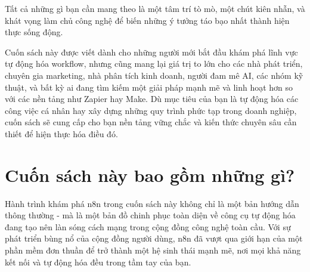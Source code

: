 \documentclass[a4paper,12pt,oneside]{book}
\begin{document}
Tất cả những gì bạn cần mang theo là một tâm trí tò mò, một chút kiên nhẫn, và khát vọng làm chủ công nghệ để biến những ý tưởng táo bạo nhất thành hiện thực sống động.

Cuốn sách này được viết dành cho những người mới bắt đầu khám phá lĩnh vực tự động hóa workflow, nhưng cũng mang lại giá trị to lớn cho các nhà phát triển, chuyên gia marketing, nhà phân tích kinh doanh, người đam mê AI, các nhóm kỹ thuật, và bất kỳ ai đang tìm kiếm một giải pháp mạnh mẽ và linh hoạt hơn so với các nền tảng như Zapier hay Make. Dù mục tiêu của bạn là tự động hóa các công việc cá nhân hay xây dựng những quy trình phức tạp trong doanh nghiệp, cuốn sách sẽ cung cấp cho bạn nền tảng vững chắc và kiến thức chuyên sâu cần thiết để hiện thực hóa điều đó.

\newpage
\section*{Cuốn sách này bao gồm những gì?}
\begin{center}
    
\end{center}

Hành trình khám phá n8n trong cuốn sách này không chỉ là một bản hướng dẫn thông thường - mà là một bản đồ chinh phục toàn diện về công cụ tự động hóa đang tạo nên làn sóng cách mạng trong cộng đồng công nghệ toàn cầu. Với sự phát triển bùng nổ của cộng đồng người dùng, n8n đã vượt qua giới hạn của một phần mềm đơn thuần để trở thành một hệ sinh thái mạnh mẽ, nơi mọi khả năng kết nối và tự động hóa đều trong tầm tay của bạn.
\end{document}
